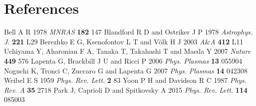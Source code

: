 \section*{References}
\begin{thebibliography}{20}
 Bell A R 1978 \textit{MNRAS} \textbf{182} 147
 Blandford R D and Ostriker J P 1978 \textit{Astrophys. J.} \textbf{221} L29 
 Berezhko E G, Ksenofontov L T and V{\"o}lk H J  2003 \textit{A}{\&}\textit{A} \textbf{412} L11
 Uchiyama Y, Aharonian F A, Tanaka T, Takahashi T and Maeda Y 2007 \textit{Nature} \textbf{449} 576
 Lapenta G, Brackbill J U and Ricci P 2006 \textit{Phys. Plasmas} \textbf{13} 055904
 Noguchi K, Tronci C, Zuccaro G and Lapenta G 2007 \textit{Phys. Plasmas} \textbf{14} 042308
 Weibel E S 1959 \textit{Phys. Rev. Lett.} \textbf{2} 83
 Yoon P H and Davidson R C 1987 \textit{Phys. Rev. A} \textbf{35} 2718
 Park J, Caprioli D and Spitkovsky A 2015 \textit{Phys. Rev. Lett.} \textbf{114} 085003
\end{thebibliography}